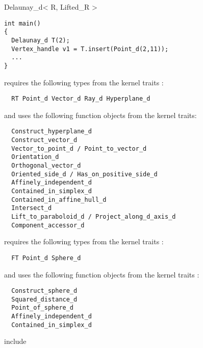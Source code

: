 \begin{ccRefClass}{Delaunay_d< R, Lifted_R >}
\begin{verbatim}
int main()
{
  Delaunay_d T(2);
  Vertex_handle v1 = T.insert(Point_d(2,11));
  ...
}
\end{verbatim}
 




 requires the following types from the kernel traits :
\begin{verbatim}
  RT Point_d Vector_d Ray_d Hyperplane_d 
\end{verbatim}
and uses the following function objects from the kernel traits:
\begin{verbatim}
  Construct_hyperplane_d
  Construct_vector_d
  Vector_to_point_d / Point_to_vector_d
  Orientation_d
  Orthogonal_vector_d
  Oriented_side_d / Has_on_positive_side_d
  Affinely_independent_d
  Contained_in_simplex_d
  Contained_in_affine_hull_d
  Intersect_d
  Lift_to_paraboloid_d / Project_along_d_axis_d
  Component_accessor_d
\end{verbatim}
 requires the following types from the kernel traits :
\begin{verbatim}
  FT Point_d Sphere_d 
\end{verbatim}
and uses the following function objects from the kernel traits :
\begin{verbatim}
  Construct_sphere_d
  Squared_distance_d
  Point_of_sphere_d
  Affinely_independent_d
  Contained_in_simplex_d
\end{verbatim}
 



include 



\end{ccRefClass}


